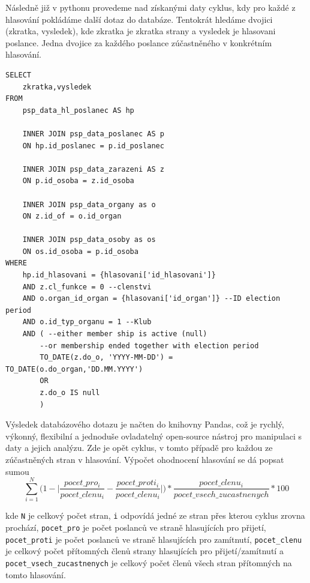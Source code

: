 Následně již v pythonu provedeme nad získanými daty cyklus, kdy pro každé z hlasování pokládáme další dotaz do databáze. Tentokrát hledáme dvojici (zkratka, vysledek), kde zkratka je zkratka strany a vysledek je hlasovani poslance. Jedna dvojice za každého poslance zúčastněného v konkrétním hlasování. \\
\begin{verbatim}
SELECT 
    zkratka,vysledek
FROM 
    psp_data_hl_poslanec AS hp 

    INNER JOIN psp_data_poslanec AS p 
    ON hp.id_poslanec = p.id_poslanec 
    
    INNER JOIN psp_data_zarazeni AS z
    ON p.id_osoba = z.id_osoba
    
    INNER JOIN psp_data_organy as o
    ON z.id_of = o.id_organ
    
    INNER JOIN psp_data_osoby as os
    ON os.id_osoba = p.id_osoba
WHERE 
    hp.id_hlasovani = {hlasovani['id_hlasovani']}
    AND z.cl_funkce = 0 --clenstvi
    AND o.organ_id_organ = {hlasovani['id_organ']} --ID election period 
    AND o.id_typ_organu = 1 --Klub
    AND ( --either member ship is active (null) 
        --or membership ended together with election period
        TO_DATE(z.do_o, 'YYYY-MM-DD') = TO_DATE(o.do_organ,'DD.MM.YYYY')
        OR 
        z.do_o IS null
        )
\end{verbatim}

Výsledek databázového dotazu je načten do knihovny Pandas, což je rychlý, výkonný, flexibilní a jednoduše ovladatelný open-source nástroj pro manipulaci s daty a jejich analýzu\cite{pandas}. Zde je opět cyklus, v tomto případě pro každou ze zúčastněných stran v hlasování. Výpočet ohodnocení hlasování se dá popsat sumou
\begin{equation}
    \sum_{i=1}^N \Big(1-\Big|\frac{pocet\_pro_i}{pocet\_clenu_i}-\frac{pocet\_proti_i}{pocet\_clenu_i}\Big|\Big) * \frac{pocet\_clenu_i}{pocet\_vsech\_zucastnenych} * 100
\end{equation}

kde \texttt{N} je celkový počet stran, \texttt{i} odpovídá jedné ze stran přes kterou cyklus zrovna prochází, \texttt{pocet\_pro} je počet poslanců ve straně hlasujících pro přijetí, \texttt{pocet\_proti} je počet poslanců ve straně hlasujících pro zamítnutí, \texttt{pocet\_clenu} je celkový počet přítomných členů strany hlasujících pro přijetí/zamítnutí a \texttt{pocet\_vsech\_zucastnenych} je celkový počet členů všech stran přítomných na tomto hlasování.

